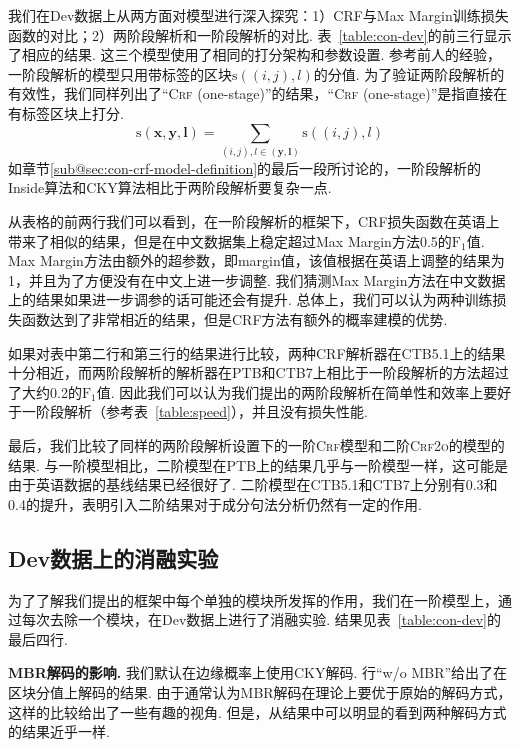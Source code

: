 我们在Dev数据上从两方面对模型进行深入探究：1）CRF与Max Margin训练损失函数的对比；2）两阶段解析和一阶段解析的对比.
表~\ref{table:con-dev}的前三行显示了相应的结果.
这三个模型使用了相同的打分架构和参数设置.
参考前人的经验\citep{stern-etal-2017-minimal}，一阶段解析的模型只用带标签的区块$\mathrm{s}((i,j),l)$的分值.
为了验证两阶段解析的有效性，我们同样列出了``\textsc{Crf} (one-stage)''的结果，``\textsc{Crf} (one-stage)''是指直接在有标签区块上打分.
\begin{equation} \label{eq:tree-label-score}
  \mathrm{s}(\boldsymbol{x},\boldsymbol{y},\boldsymbol{l}) =
  \sum_{(i,j),l \in (\boldsymbol{y}, \boldsymbol{l})} \mathrm{s}((i,j),l)
\end{equation}
如章节\ref{sub@sec:con-crf-model-definition}的最后一段所讨论的，一阶段解析的Inside算法和CKY算法相比于两阶段解析要复杂一点.

从表格的前两行我们可以看到，在一阶段解析的框架下，CRF损失函数在英语上带来了相似的结果，但是在中文数据集上稳定超过Max Margin方法0.5的$\mathrm{F}_1$值.
Max Margin方法由额外的超参数，即margin值，该值根据在英语上调整的结果为1，并且为了方便没有在中文上进一步调整.
我们猜测Max Margin方法在中文数据上的结果如果进一步调参的话可能还会有提升.
总体上，我们可以认为两种训练损失函数达到了非常相近的结果，但是CRF方法有额外的概率建模的优势.

如果对表中第二行和第三行的结果进行比较，两种CRF解析器在CTB5.1上的结果十分相近，而两阶段解析的解析器在PTB和CTB7上相比于一阶段解析的方法超过了大约0.2的$\mathrm{F}_1$值.
因此我们可以认为我们提出的两阶段解析在简单性和效率上要好于一阶段解析（参考表~\ref{table:speed}），并且没有损失性能.

最后，我们比较了同样的两阶段解析设置下的一阶\textsc{Crf}模型和二阶\textsc{Crf2o}的模型的结果.
与一阶模型相比，二阶模型在PTB上的结果几乎与一阶模型一样，这可能是由于英语数据的基线结果已经很好了.
二阶模型在CTB5.1和CTB7上分别有0.3和0.4的提升，表明引入二阶结果对于成分句法分析仍然有一定的作用.

\subsection{Dev数据上的消融实验}

为了了解我们提出的框架中每个单独的模块所发挥的作用，我们在一阶模型上，通过每次去除一个模块，在Dev数据上进行了消融实验.
结果见表~\ref{table:con-dev}的最后四行.

\noindent\textbf{MBR解码的影响.}
我们默认在边缘概率上使用CKY解码.
行``w/o MBR''给出了在区块分值上解码的结果.
由于通常认为MBR解码在理论上要优于原始的解码方式，这样的比较给出了一些有趣的视角.
但是，从结果中可以明显的看到两种解码方式的结果近乎一样.


